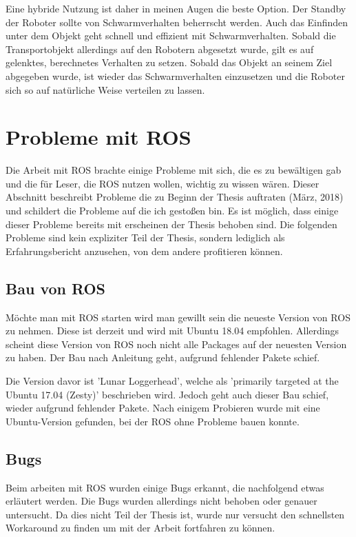 Eine hybride Nutzung ist daher in meinen Augen die beste Option. Der Standby der Roboter sollte von Schwarmverhalten beherrscht werden. Auch das Einfinden unter dem Objekt geht schnell und effizient mit Schwarmverhalten. Sobald die Transportobjekt allerdings auf den Robotern abgesetzt wurde, gilt es auf gelenktes, berechnetes Verhalten zu setzen. Sobald das Objekt an seinem Ziel abgegeben wurde, ist wieder das Schwarmverhalten einzusetzen und die Roboter sich so auf natürliche Weise verteilen zu lassen.








\section{Probleme mit ROS}
Die Arbeit mit \ac{ROS} brachte einige Probleme mit sich, die es zu bewältigen gab und die für Leser, die \ac{ROS} nutzen wollen, wichtig zu wissen wären. Dieser Abschnitt beschreibt Probleme die zu Beginn der Thesis auftraten (März, 2018) und schildert die Probleme auf die ich gestoßen bin. Es ist möglich, dass einige dieser Probleme bereits mit erscheinen der Thesis behoben sind. Die folgenden Probleme sind kein expliziter Teil der Thesis, sondern lediglich als Erfahrungsbericht anzusehen, von dem andere profitieren können.

\subsection*{Bau von ROS}
Möchte man mit \ac{ROS} starten wird man gewillt sein die neueste Version von \ac{ROS} zu nehmen. Diese ist derzeit  und wird mit Ubuntu 18.04 empfohlen. Allerdings scheint diese Version von \ac{ROS} noch nicht alle Packages auf der neuesten Version zu haben. Der Bau nach Anleitung geht, aufgrund fehlender Pakete schief.

Die Version davor ist 'Lunar Loggerhead', welche als 'primarily targeted at the Ubuntu 17.04 (Zesty)' beschrieben wird. Jedoch geht auch dieser Bau schief, wieder aufgrund fehlender Pakete. Nach einigem Probieren wurde mit  eine Ubuntu-Version gefunden, bei der \ac{ROS} ohne Probleme bauen konnte.

\subsection*{Bugs}
Beim arbeiten mit \ac{ROS} wurden einige Bugs erkannt, die nachfolgend etwas erläutert werden. Die Bugs wurden allerdings nicht behoben oder genauer untersucht. Da dies nicht Teil der Thesis ist, wurde nur versucht den schnellsten Workaround zu finden um mit der Arbeit fortfahren zu können.

